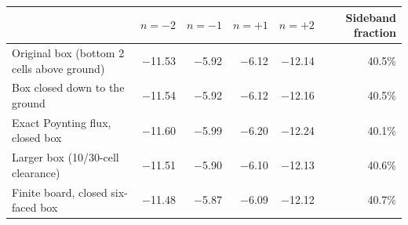 \begin{tabular}{@{}lrrrrr@{}}\toprule
 & $n=-2$ & $n=-1$ & $n=+1$ & $n=+2$ & Sideband fraction \\\midrule
Original box (bottom 2 cells above ground) & $-$11.53 & $-$5.92 & $-$6.12 & $-$12.14 & 40.5\% \\
Box closed down to the ground & $-$11.54 & $-$5.92 & $-$6.12 & $-$12.16 & 40.5\% \\
Exact Poynting flux, closed box & $-$11.60 & $-$5.99 & $-$6.20 & $-$12.24 & 40.1\% \\
Larger box (10/30-cell clearance) & $-$11.51 & $-$5.90 & $-$6.10 & $-$12.13 & 40.6\% \\
Finite board, closed six-faced box & $-$11.48 & $-$5.87 & $-$6.09 & $-$12.12 & 40.7\% \\
\bottomrule\end{tabular}
